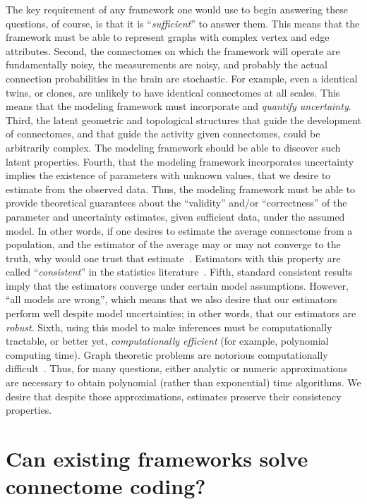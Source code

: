 \documentclass[11pt]{article}
\begin{document}
The key requirement of any framework one would use to begin answering these questions, of course, is that it is ``\emph{sufficient}'' to answer them.  This means that the framework must be able to represent graphs with complex vertex and edge attributes.  
Second, the connectomes on which the framework will operate are fundamentally noisy, the measurements are noisy, and probably the actual connection probabilities in the brain are stochastic.  For example, even a identical twins, or clones, are unlikely to have identical connectomes at all scales.  
This means that the modeling framework must incorporate and \emph{quantify uncertainty}. 
Third, the latent geometric and topological structures that guide the development of connectomes, and that guide the activity given connectomes, could be arbitrarily complex.  The modeling framework should be able to discover such latent properties.
Fourth, that the modeling framework incorporates uncertainty implies the existence of parameters with unknown values, that we desire to estimate from the observed data.
Thus, the modeling framework must be able to provide theoretical guarantees about the ``validity'' and/or ``correctness'' of the parameter and uncertainty estimates, given sufficient data, under the assumed model. In other words, if one desires to estimate the average connectome from a population, and the estimator of the average may or may not converge to the truth, why would one trust that estimate~\cite{Tang2016-conn}. 
Estimators with this property are called ``\emph{consistent}'' in the statistics literature~\cite{Bickel2000-kb}.
Fifth, standard consistent results imply that the estimators converge under certain model assumptions.  However, ``all models are wrong'', which means that we also desire that our estimators perform well despite model uncertainties; in other words, that our estimators are \emph{robust}.
Sixth, using this model to make inferences must be computationally tractable, or better yet, \emph{computationally efficient} (for example, polynomial computing time).  Graph theoretic problems are notorious computationally difficult~\cite{Lyzinski2016-hb}.  Thus, for many questions, either analytic or numeric approximations are necessary to obtain polynomial (rather than exponential) time algorithms.  
We desire that despite those approximations, estimates preserve their consistency properties.  








\section{Can existing frameworks solve connectome coding?}
\end{document}
